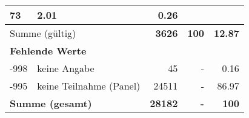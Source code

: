 \begin{longtable}{lXrrr}
       \num{73} &
       \num[round-mode=places,round-precision=2]{2,01} &
         \num[round-mode=places,round-precision=2]{0,26} \\
     \midrule
     \multicolumn{2}{l}{Summe (gültig)} &
       \textbf{\num{3626}} &
     \textbf{100} &
       \textbf{\num[round-mode=places,round-precision=2]{12,87}} \\
     \multicolumn{5}{l}{\textbf{Fehlende Werte}}\\
       -998 &
       keine Angabe &
         \num{45} &
        - &
         \num[round-mode=places,round-precision=2]{0,16} \\
       -995 &
       keine Teilnahme (Panel) &
         \num{24511} &
        - &
         \num[round-mode=places,round-precision=2]{86,97} \\
     \midrule
     \multicolumn{2}{l}{\textbf{Summe (gesamt)}} &
          \textbf{\num{28182}} &
        \textbf{-} &
        \textbf{100} \\
     \bottomrule
     \end{longtable}
     
